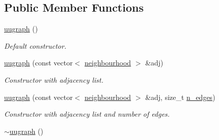 \subsection*{Public Member Functions}
\begin{DoxyCompactItemize}
\item 
\hypertarget{classlgraph_1_1utils_1_1uugraph_a8b92ac8dccde231b9d35fbe20be8d1ed}{\hyperlink{classlgraph_1_1utils_1_1uugraph_a8b92ac8dccde231b9d35fbe20be8d1ed}{uugraph} ()}\label{classlgraph_1_1utils_1_1uugraph_a8b92ac8dccde231b9d35fbe20be8d1ed}

\begin{DoxyCompactList}\small\item\em Default constructor. \end{DoxyCompactList}\item 
\hyperlink{classlgraph_1_1utils_1_1uugraph_acf307fa54951b37c805dd3b570171280}{uugraph} (const vector$<$ \hyperlink{namespacelgraph_1_1utils_a0f2ef47028a466d26841709e705390ac}{neighbourhood} $>$ \&adj)
\begin{DoxyCompactList}\small\item\em Constructor with adjacency list. \end{DoxyCompactList}\item 
\hyperlink{classlgraph_1_1utils_1_1uugraph_a9084c463d0aa249f3a6d1e8cb9e06d33}{uugraph} (const vector$<$ \hyperlink{namespacelgraph_1_1utils_a0f2ef47028a466d26841709e705390ac}{neighbourhood} $>$ \&adj, size\-\_\-t \hyperlink{classlgraph_1_1utils_1_1xxgraph_af3f7c3835406c2cbf70479ae1c0253c9}{n\-\_\-edges})
\begin{DoxyCompactList}\small\item\em Constructor with adjacency list and number of edges. \end{DoxyCompactList}\item 
\hypertarget{classlgraph_1_1utils_1_1uugraph_a7c990a2d79beea5f05bb9d4c13071cf6}{\hyperlink{classlgraph_1_1utils_1_1uugraph_a7c990a2d79beea5f05bb9d4c13071cf6}{$\sim$uugraph} ()}\label{classlgraph_1_1utils_1_1uugraph_a7c990a2d79beea5f05bb9d4c13071cf6}


\end{DoxyCompactItemize}
